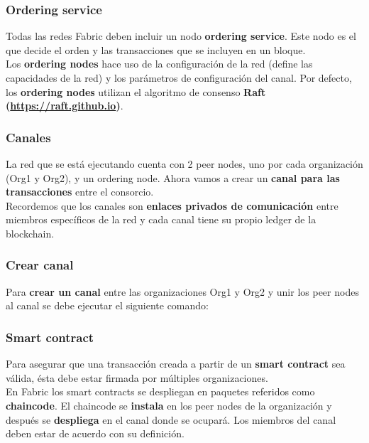 \documentclass{beamer}
\begin{document}
	\begin{frame}
		\frametitle{Ordering service}
		Todas las redes Fabric deben incluir un nodo \textbf{ordering service}. Este nodo es el que decide el orden y las transacciones que se incluyen en un bloque.\\
		\vspace{4mm}
		Los \textbf{ordering nodes} hace uso de la configuración de la red (define las capacidades de la red) y los parámetros de configuración del canal. Por defecto, los \textbf{ordering nodes} utilizan el algoritmo de consenso \textbf{Raft (\url{https://raft.github.io})}.
	\end{frame}
	
	\begin{frame}
		\frametitle{Canales}
		La red que se está ejecutando cuenta con 2 peer nodes, uno por cada organización (Org1 y Org2), y un ordering node. Ahora vamos a crear un \textbf{canal para las transacciones} entre el consorcio.\\
		\vspace{4mm}
		Recordemos que los canales son \textbf{enlaces privados de comunicación} entre miembros específicos de la red y cada canal tiene su propio ledger de la blockchain.
	\end{frame}
	
	\begin{frame}
		\frametitle{Crear canal}
		Para \textbf{crear un canal} entre las organizaciones Org1 y Org2 y unir los peer nodes al canal se debe ejecutar el siguiente comando:
		\begin{center}
			\setlength{\fboxrule}{1mm}
			\setlength{\fboxsep}{3mm}
			\framebox[9cm][c]{
				\textbf{./network.sh createChannel}
			}
		\end{center}
	\end{frame}

	\begin{frame}
		\frametitle{Smart contract}
		Para asegurar que una transacción creada a partir de un \textbf{smart contract} sea válida, ésta debe estar firmada por múltiples organizaciones.\\
		\vspace{4mm}
		En Fabric los smart contracts se despliegan en paquetes referidos como \textbf{chaincode}. El chaincode se \textbf{instala} en los peer nodes de la organización y después se \textbf{despliega} en el canal donde se ocupará. Los miembros del canal deben estar de acuerdo con su definición.
	\end{frame}
\end{document}
